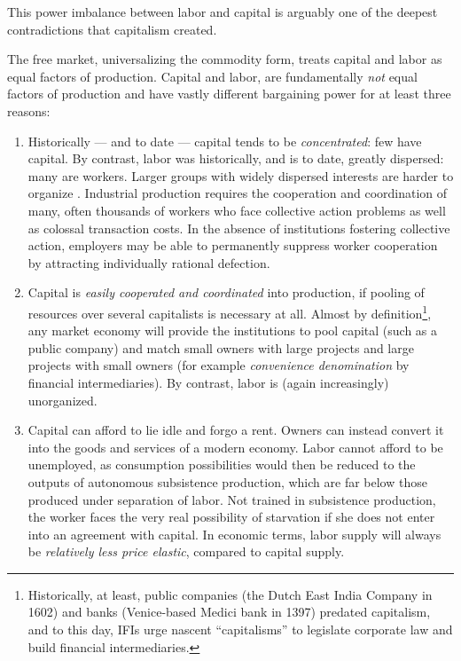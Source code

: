This power imbalance between labor and capital is arguably one of the deepest contradictions that capitalism created.

The free market, universalizing the commodity form, treats capital and labor as equal factors of production. Capital and labor, are fundamentally \emph{not} equal factors of production and have vastly different bargaining power for at least three reasons:

\begin{enumerate}
	\item Historically --- and to date --- capital tends to be \emph{concentrated}: few have capital. By contrast, labor was historically, and is to date, greatly dispersed: many are workers. Larger groups with widely dispersed interests are harder to organize \citep{Olson-1971-aa}. Industrial production requires the cooperation and coordination of many, often thousands of workers who face collective action problems as well as colossal transaction costs. In the absence of institutions fostering collective action, employers may be able to permanently suppress worker cooperation by attracting individually rational defection.
	\item Capital is \emph{easily cooperated and coordinated} into production, if pooling of resources over several capitalists is necessary at all. Almost by definition\footnote{
		Historically, at least, public companies (the Dutch East India Company in 1602) and banks (Venice-based Medici bank in 1397) predated capitalism, and to this day, \glspl{IFI} urge nascent ``capitalisms'' to legislate corporate law and build financial intermediaries.}, %
	any market economy will provide the institutions to pool capital (such as a public company) and match small owners with large projects and large projects with small owners (for example  \emph{convenience denomination} by financial intermediaries). By contrast, labor is (again increasingly) unorganized.
	\item Capital can afford to lie idle and forgo a rent. Owners can instead convert it into the goods and services of a modern economy. Labor cannot afford to be unemployed, as consumption possibilities would then be reduced to the outputs of autonomous subsistence production, which are far below those produced under separation of labor. Not trained in subsistence production, the worker faces the very real possibility of starvation if she does not enter into an agreement with capital. In economic terms, labor supply will always be \emph{relatively less price elastic}, compared to capital supply.
\end{enumerate}

